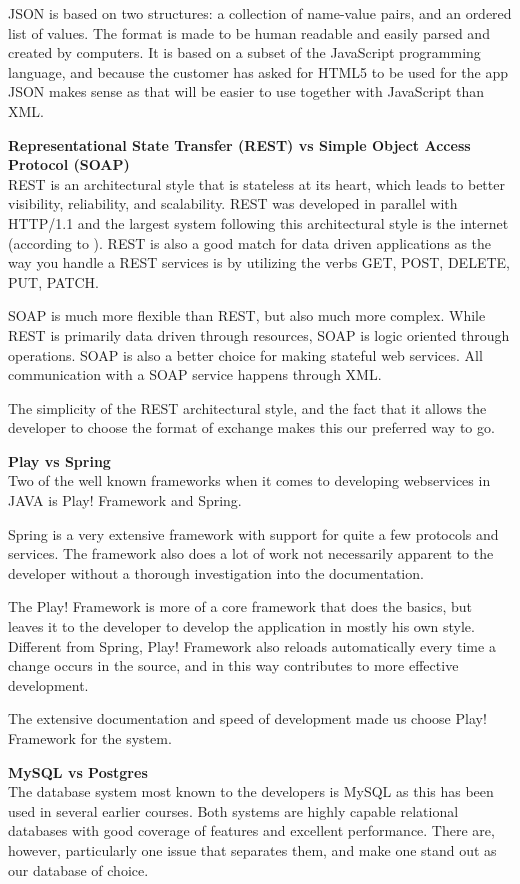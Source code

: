 \documentclass[11pt]{book}
\begin{document}
JSON \cite{json} is based on two structures: a collection of name-value pairs, and an ordered list of values. The format is made to be human readable and easily parsed and created by computers. It is based on a subset of the JavaScript programming language, and because the customer has asked for HTML5 to be used for the app JSON makes sense as that will be easier to use together with JavaScript than XML.

\textbf{Representational State Transfer (REST) vs Simple Object Access Protocol (SOAP)}\\
REST \cite{rest} is an architectural style that is stateless at its heart, which leads to better visibility, reliability, and scalability. REST was developed in parallel with HTTP/1.1 and the largest system following this architectural style is the internet (according to \cite{wikipedia:rest}). REST is also a good match for data driven applications as the way you handle a REST services is by utilizing the verbs GET, POST, DELETE, PUT, PATCH.

SOAP is much more flexible than REST, but also much more complex. While REST is primarily data driven through resources, SOAP is logic oriented through operations. SOAP is also a better choice for making stateful web services. All communication with a SOAP service happens through XML.

The simplicity of the REST architectural style, and the fact that it allows the developer to choose the format of exchange makes this our preferred way to go.

\textbf{Play vs Spring}\\
Two of the well known frameworks when it comes to developing webservices in JAVA is Play! Framework and Spring.

Spring is a very extensive framework with support for quite a few protocols and services. The framework also does a lot of work not necessarily apparent to the developer without a thorough investigation into the documentation.

The Play! Framework is more of a core framework that does the basics, but leaves it to the developer to develop the application in mostly his own style. Different from Spring, Play! Framework also reloads automatically every time a change occurs in the source, and in this way contributes to more effective development.

The extensive documentation and speed of development made us choose Play! Framework for the system.

\textbf{MySQL vs Postgres}\\
The database system most known to the developers is MySQL as this has been used in several earlier courses. Both systems are highly capable relational databases with good coverage of features and excellent performance. There are, however, particularly one issue that separates them, and make one stand out as our database of choice.
\end{document}
